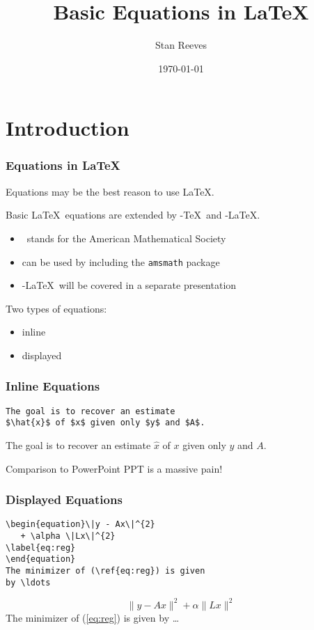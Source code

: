 \documentclass{beamer}
\title{Basic Equations in \LaTeX }
\author{{Stan Reeves}}
\institute{Department of Electrical and Computer Engineering}
\date{\today}
\begin{document}
\frame{\titlepage}

\section{Introduction}
\frame
{
\frametitle{Equations in \LaTeX\ }
Equations may be the best reason to use \LaTeX.

Basic \LaTeX\ equations are extended by \AmS-\TeX\ and \AmS-\LaTeX.
\begin{itemize}
\item \AmS\ stands for the American Mathematical Society
\item can be used by including the \texttt{amsmath} package
\item \AmS-\LaTeX\ will be covered in a separate presentation
\end{itemize}

Two types of equations:
\begin{itemize}
    \item inline
    \item displayed
\end{itemize}

}


\begin{frame}[fragile]
\frametitle{Inline Equations}
\begin{verbatim}
The goal is to recover an estimate 
$\hat{x}$ of $x$ given only $y$ and $A$.
\end{verbatim}

The goal is to recover an estimate 
$\hat{x}$ of $x$ given only $y$ and $A$.

\begin{block}{Comparison to PowerPoint}
PPT is a massive pain!
\end{block}
\end{frame}

\begin{frame}[fragile]
\frametitle{Displayed Equations}
\begin{verbatim}
\begin{equation}\|y - Ax\|^{2} 
   + \alpha \|Lx\|^{2}
\label{eq:reg}
\end{equation}
The minimizer of (\ref{eq:reg}) is given 
by \ldots
\end{verbatim}

\begin{equation}\|y - Ax\|^{2} 
   + \alpha \|Lx\|^{2}
\label{eq:reg}
\end{equation}
The minimizer of (\ref{eq:reg}) is given 
by \ldots
\end{frame}
\end{document}
